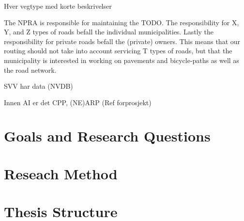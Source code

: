 	Hver vegtype med korte beskrivelser

The NPRA is responsible for maintaining the TODO. The responsibility for X, Y, and Z types of roads befall the individual municipalities. Lastly the responsibility for private roads befall the (private) owners. This means that our routing should not take into account servicing T types of roads, but that the municipality is interested in working on pavements and bicycle-paths as well as the road network.

SVV har data (NVDB)

Innen AI er det CPP, (NE)ARP (Ref forprosjekt)

\section{Goals and Research Questions}

\section{Reseach Method}

\section{Thesis Structure}



\cleardoublepage
